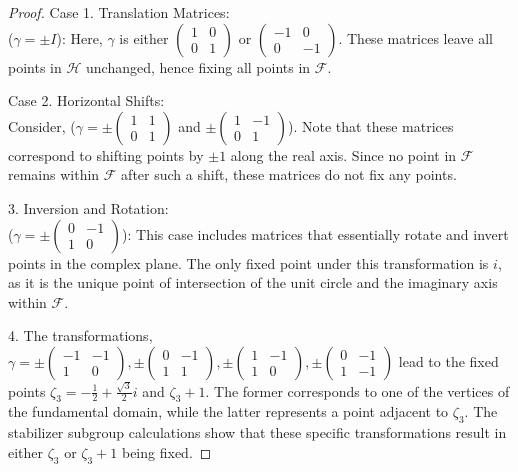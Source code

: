 \begin{proposition}
\begin{proof}
Case 1. Translation Matrices: \\ (\( \gamma = \pm I \)): Here, \( \gamma \) is either \( \begin{pmatrix} 1 & 0 \\ 0 & 1 \end{pmatrix} \) or \( \begin{pmatrix} -1 & 0 \\ 0 & -1 \end{pmatrix} \). These matrices leave all points in \( \mathcal{H} \) unchanged, hence fixing all points in \( \mathcal{F} \).

Case 2. Horizontal Shifts: \\  Consider, 
(\( \gamma = \pm\begin{pmatrix} 1 & 1 \\ 0 & 1 \end{pmatrix} \) and \( \pm\begin{pmatrix} 1 & -1 \\ 0 & 1 \end{pmatrix} \)). Note that these matrices correspond to shifting points by \( \pm 1 \) along the real axis. Since no point in \( \mathcal{F} \) remains within \( \mathcal{F} \) after such a shift, these matrices do not fix any points.

3. Inversion and Rotation: \\
(\( \gamma = \pm\begin{pmatrix} 0 & -1 \\ 1 & 0 \end{pmatrix} \)): 
This case includes matrices that essentially rotate and invert points in the complex plane.
The only fixed point under this transformation is \( i \), as it is the unique point of intersection of the unit circle and the imaginary axis within \( \mathcal{F} \).

4. The transformations, \( \gamma = \pm\begin{pmatrix} -1 & -1 \\ 1 & 0 \end{pmatrix}, \pm\begin{pmatrix} 0 & -1 \\ 1 & 1 \end{pmatrix}, \pm\begin{pmatrix} 1 & -1 \\ 1 & 0 \end{pmatrix}, \pm\begin{pmatrix} 0 & -1 \\ 1 & -1 \end{pmatrix} \) lead to the fixed points \( \zeta_3 = -\frac{1}{2} + \frac{\sqrt{3}}{2}i \) and \( \zeta_3 + 1 \). The former corresponds to one of the vertices of the fundamental domain, while the latter represents a point adjacent to \( \zeta_3 \). The stabilizer subgroup calculations show that these specific transformations result in either \( \zeta_3 \) or \( \zeta_3 + 1 \) being fixed.

   \end{proof}
\end{proposition}

